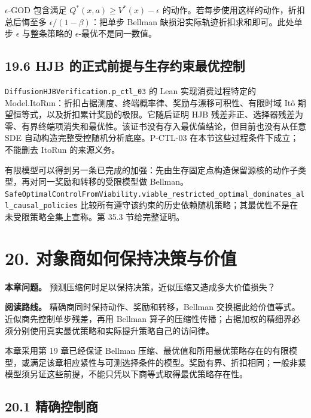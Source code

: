 \documentclass[
  11pt,
  oneside]{book}
\begin{document}
\(\epsilon\)-GOD 包含满足 \(Q^*(x,a)\ge V^*(x)-\epsilon\) 的动作。若每步使用这样的动作，折扣总后悔至多 \(\epsilon/(1-\beta)\)：把单步 Bellman 缺损沿实际轨迹折扣求和即可。此处单步 \(\epsilon\) 与整条策略的 \(\epsilon\)-最优不是同一数值。

\section{19.6 HJB 的正式前提与生存约束最优控制}\label{hjb-ux7684ux6b63ux5f0fux524dux63d0ux4e0eux751fux5b58ux7ea6ux675fux6700ux4f18ux63a7ux5236}

\nolinkurl{DiffusionHJBVerification.p_ctl_03} 的 Lean 实现消费过程特定的 Model.ItoRun：折扣占据测度、终端概率律、奖励与漂移可积性、有限时域 Itô 期望恒等式，以及折扣累计奖励的极限。它随后证明 HJB 残差非正、选择器残差为零、有界终端项消失和最优性。该证书没有存入最优值结论，但目前也没有从任意 SDE 自动构造完整受控随机分析底座。P-CTL-03 在本节这些过程条件下成立；不能删去 ItoRun 的来源义务。

有限模型可以得到另一条已完成的加强：先由生存固定点构造保留源核的动作子类型，再对同一奖励和转移的受限模型做 Bellman。\nolinkurl{SafeOptimalControlFromViability.viable_restricted_optimal_dominates_all_causal_policies} 比较所有遵守该约束的历史依赖随机策略；其最优性不是在未受限策略全集上宣称。第 35.3 节给完整证明。

\chapter{20. 对象商如何保持决策与价值}\label{ch-20}

\textbf{本章问题。} 预测压缩何时足以保持决策，近似压缩又造成多大价值损失？

\textbf{阅读路线。} 精确商同时保持动作、奖励和转移，Bellman 交换据此给价值等式。近似商先控制单步残差，再用 Bellman 算子的压缩性传播；占据加权的精细界必须分别使用真实最优策略和实际提升策略自己的访问律。

本章采用第 19 章已经保证 Bellman 压缩、最优值和所用最优策略存在的有限模型，或满足该章相应紧性与可测选择条件的模型。奖励有界、折扣相同；一般非紧模型须另证这些前提，不能只凭以下商等式取得最优策略存在性。

\section{20.1 精确控制商}\label{ux7cbeux786eux63a7ux5236ux5546}

\hypertarget{p-quo-01}{}\label{p-quo-01}
\end{document}
